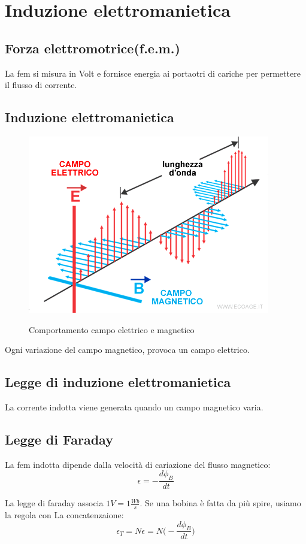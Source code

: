\section{Induzione elettromanietica}
\subsection{Forza elettromotrice(f.e.m.)}
La fem si misura in Volt e fornisce energia ai portaotri di cariche
per permettere il flusso di corrente.

\subsection{Induzione elettromanietica}
\begin{figure}[H]
    \centering
    \includegraphics[width=0.3\linewidth]{imgs/17 - induzione elettromanietica.png}
    \label{fig:induzione_elettromanietica}
    \caption{Comportamento campo elettrico e magnetico}
\end{figure}
Ogni variazione del campo magnetico, provoca un campo elettrico.

\subsection{Legge di induzione elettromanietica}
La corrente indotta viene generata quando un campo magnetico varia.

\subsection{Legge di Faraday}
La fem indotta dipende dalla velocità di cariazione del flusso magnetico:
\begin{equation*}
    \epsilon = -\frac{d\phi_B}{dt}
\end{equation*}

La legge di faraday associa $1V = 1\frac{Wb}{s}$.
Se una bobina è fatta da più spire, usiamo la regola con La
concatenzaione:
\begin{equation}
    \epsilon_T = N\epsilon = N\Biggl(-\frac{d\phi_B}{dt}\Biggr)
\end{equation}

